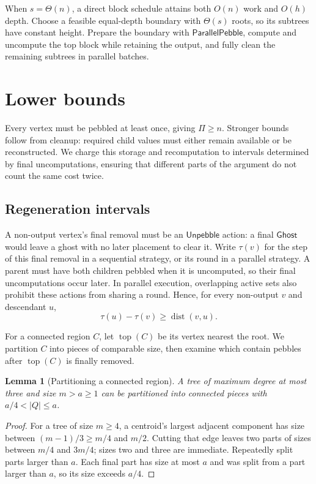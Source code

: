 \documentclass[11pt]{article}
\newtheorem{lemma}[lemma]{Lemma}
\theoremstyle{definition}
\theoremstyle{remark}
\DeclareMathOperator{\topv}{top}
\newcommand{\Unp}{\mathsf{Unpebble}}
\newcommand{\Ghost}{\mathsf{Ghost}}
\newcommand{\Sweep}{\mathsf{ParallelPebble}}
\begin{document}
When $s=\Theta(n)$, a direct block schedule attains both $O(n)$ work and $O(h)$ depth. Choose a feasible equal-depth boundary with $\Theta(s)$ roots, so its subtrees have constant height. Prepare the boundary with $\Sweep$, compute and uncompute the top block while retaining the output, and fully clean the remaining subtrees in parallel batches.

\section{Lower bounds}
\label{sec:lower-bounds}

Every vertex must be pebbled at least once, giving $\Pi\ge n$. Stronger bounds follow from cleanup: required child values must either remain available or be reconstructed. We charge this storage and recomputation to intervals determined by final uncomputations, ensuring that different parts of the argument do not count the same cost twice.

\subsection{Regeneration intervals}

A non-output vertex's final removal must be an $\Unp$ action: a final $\Ghost$ would leave a ghost with no later placement to clear it. Write $\tau(v)$ for the step of this final removal in a sequential strategy, or its round in a parallel strategy. A parent must have both children pebbled when it is uncomputed, so their final uncomputations occur later. In parallel execution, overlapping active sets also prohibit these actions from sharing a round. Hence, for every non-output $v$ and descendant $u$,
\begin{equation}
 \tau(u)-\tau(v)\ge\operatorname{dist}(v,u).
 \label{eq:final-removal}
\end{equation}

For a connected region $C$, let $\topv(C)$ be its vertex nearest the root. We partition $C$ into pieces of comparable size, then examine which contain pebbles after $\topv(C)$ is finally removed.

\begin{lemma}[Partitioning a connected region]
\label{lem:partition}
A tree of maximum degree at most three and size $m>a\ge1$ can be partitioned into connected pieces with $a/4<|Q|\le a$.
\end{lemma}
\begin{proof}
For a tree of size $m\ge4$, a centroid's largest adjacent component has size between $(m-1)/3\ge m/4$ and $m/2$. Cutting that edge leaves two parts of sizes between $m/4$ and $3m/4$; sizes two and three are immediate. Repeatedly split parts larger than $a$. Each final part has size at most $a$ and was split from a part larger than $a$, so its size exceeds $a/4$.
\end{proof}
\end{document}
